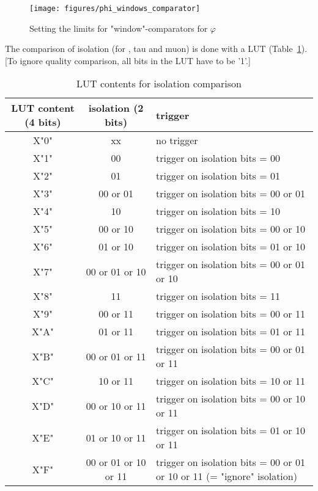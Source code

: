 \begin{figure}[htb]
\centering
\texttt{[image: figures/phi\_windows\_comparator]}
\caption{Setting the limits for "window"-comparators for $\varphi$}
\label{fig:gtl:phi_windows_comparator}
\end{figure}

The comparison of isolation (for \egamma, tau and muon) is done with a LUT (Table~\ref{tab:gtl:lut_iso}). [To ignore quality comparison, all bits in the LUT have to be '1'.]

\begin{table}[ht]
\caption{LUT contents for isolation comparison}
\vspace{5mm}
\centering
\begin{tabular}{|c|c|p{}|}\hline
LUT content (4 bits) & isolation (2 bits) & trigger \\\hline\hline
X"0" & xx & no trigger\\\hline
X"1" & 00 & trigger on isolation bits = 00\\\hline
X"2" & 01 & trigger on isolation bits = 01\\\hline
X"3" & 00 or 01 & trigger on isolation bits = 00 or 01\\\hline
X"4" & 10 & trigger on isolation bits = 10\\\hline
X"5" & 00 or 10 & trigger on isolation bits = 00 or 10\\\hline
X"6" & 01 or 10 & trigger on isolation bits = 01 or 10\\\hline
X"7" & 00 or 01 or 10 & trigger on isolation bits = 00 or 01 or 10\\\hline
X"8" & 11 & trigger on isolation bits = 11\\\hline
X"9" & 00 or 11 & trigger on isolation bits = 00 or 11\\\hline
X"A" & 01 or 11 & trigger on isolation bits = 01 or 11\\\hline
X"B" & 00 or 01 or 11 & trigger on isolation bits = 00 or 01 or 11\\\hline
X"C" & 10 or 11 & trigger on isolation bits = 10 or 11\\\hline
X"D" & 00 or 10 or 11 & trigger on isolation bits = 00 or 10 or 11\\\hline
X"E" & 01 or 10 or 11 & trigger on isolation bits = 01 or 10 or 11\\\hline
X"F" & 00 or 01 or 10 or 11 & trigger on isolation bits = 00 or 01 or 10 or 11 (= "ignore" isolation)\\\hline
\end{tabular}
\label{tab:gtl:lut_iso}
\end{table}

